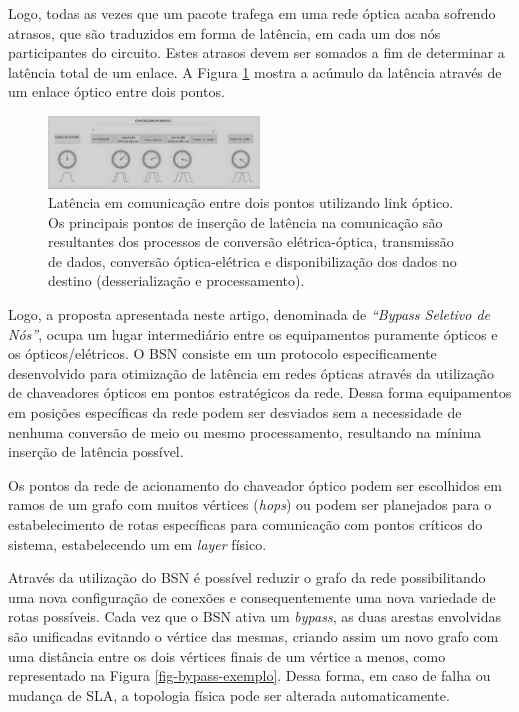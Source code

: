 Logo, todas as vezes que um pacote trafega em uma rede óptica acaba sofrendo atrasos, que são traduzidos em forma de latência, em cada um dos nós participantes do circuito. Estes atrasos devem ser somados a fim de determinar a latência total de um enlace. A Figura \ref{fig_latency_link} mostra a acúmulo da latência através de um enlace óptico entre dois pontos. 

\begin{figure} [!htb]%
	\centering
	\includegraphics[width=0.5\textwidth]{./figuras/latency-link.png}
	\caption[Latência de Link]{Latência em comunicação entre dois pontos utilizando link óptico. Os principais pontos de inserção de latência na comunicação são resultantes dos processos de conversão elétrica-óptica, transmissão de dados, conversão óptica-elétrica e disponibilização dos dados no destino (desserialização e processamento).}
	\label{fig_latency_link}
\end{figure}

Logo, a proposta apresentada neste artigo, denominada de  \emph{``Bypass Seletivo de Nós''}, ocupa um lugar intermediário entre os equipamentos puramente ópticos e os ópticos/elétricos. O BSN consiste em um protocolo especificamente desenvolvido para otimização de latência em redes ópticas através da utilização de chaveadores ópticos em pontos estratégicos da rede. Dessa forma equipamentos em posições específicas da rede podem ser desviados sem a necessidade de nenhuma conversão de meio ou mesmo processamento, resultando na mínima inserção de latência possível. 

Os pontos da rede de acionamento do chaveador óptico podem ser escolhidos em ramos de um grafo com muitos vértices (\emph{hops}) ou podem ser planejados para o estabelecimento de rotas específicas para comunicação com pontos críticos do sistema, estabelecendo um  em \emph{layer} físico.

Através da utilização do BSN é possível reduzir o grafo da rede possibilitando uma nova configuração de conexões e consequentemente uma nova variedade de rotas possíveis. Cada vez que o BSN ativa um \emph{bypass}, as duas arestas envolvidas são unificadas evitando o vértice das mesmas, criando assim um novo grafo com uma distância entre os dois vértices finais de um vértice a menos, como representado na Figura \ref{fig-bypass-exemplo}. Dessa forma, em caso de falha ou mudança de SLA, a topologia física pode ser alterada automaticamente.

